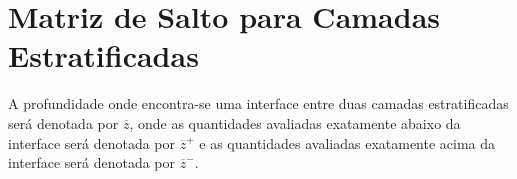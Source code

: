 \section{Matriz de Salto para Camadas Estratificadas}

A profundidade onde encontra-se uma interface entre duas camadas estratificadas ser\'a denotada por $\overline{z}$, onde as quantidades avaliadas exatamente abaixo da interface ser\'a denotada por $\overline{z}^+$ e as quantidades avaliadas exatamente acima da interface ser\'a denotada por $\overline{z}^-$.